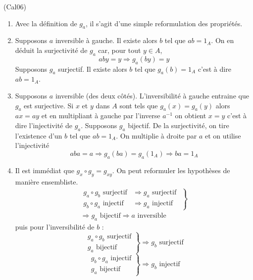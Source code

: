 \begin{tiny}(Cal06)\end{tiny}
\begin{enumerate}
 \item Avec la définition de $g_a$, il s'agit d'une simple reformulation des propriétés. 
 \item Supposons $a$ inversible à gauche. Il existe alors $b$ tel que $ab=1_A$. On en déduit la surjectivité de $g_a$ car, pour tout $y\in A$,
\begin{displaymath}
 aby=y\Rightarrow g_a(by)=y
\end{displaymath}
Supposons $g_a$ surjectif. Il existe alors $b$ tel que $g_a(b)=1_A$ c'est à dire $ab=1_A$.
 \item Supposons $a$ inversible (des deux côtés). L'inversibilité à gauche entraine que $g_a$ est surjective. Si $x$ et $y$ dans $A$ sont tels que $g_a(x)=g_a(y)$ alors $ax=ay$ et en multipliant à gauche par l'inverse $a^{-1}$ on obtient $x=y$ c'est à dire l'injectivité de $g_a$.\newline
Supposons $g_a$ bijectif. De la surjectivité, on tire l'existence d'un $b$ tel que $ab=1_A$. On multiplie à droite par $a$ et on utilise l'injectivité
\begin{displaymath}
 aba=a\Rightarrow g_a(ba)=g_a(1_A) \Rightarrow ba=1_A
\end{displaymath}

 \item Il est immédiat que $g_x \circ g_y = g_{xy}$. On peut reformuler les hypothèses de manière ensembliste.
\begin{multline*}
 \left. 
\begin{aligned}
 g_a \circ g_b\text{ surjectif} &\Rightarrow g_a \text{ surjectif }\\
 g_b \circ g_a \text{ injectif} &\Rightarrow g_a \text{ injectif }
\end{aligned}
\right\rbrace \\ 
\Rightarrow
 g_a \text{ bijectif} \Rightarrow a \text{ inversible }
\end{multline*}
puis pour l'inversibilité de $b$ :
\begin{displaymath}
 \left. 
\begin{aligned}
 g_a \circ g_b\text{ surjectif}\\
 g_a \text{ bijectif}
\end{aligned}
\right\rbrace \Rightarrow g_b \text{ surjectif}
\end{displaymath}
\begin{displaymath}
 \left. 
\begin{aligned}
 g_b \circ g_a\text{ injectif}\\
 g_a \text{ bijectif}
\end{aligned}
\right\rbrace \Rightarrow g_b \text{ injectif}
\end{displaymath}

\end{enumerate}
